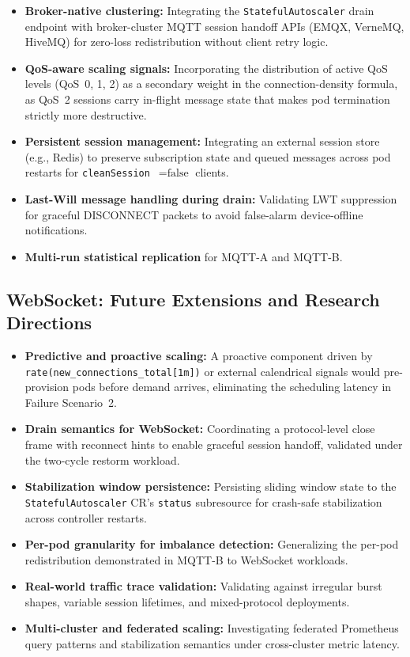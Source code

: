 \documentclass[twocolumn]{svjour3}
\begin{document}
\begin{itemize}[leftmargin=*]
  \item \textbf{Broker-native clustering:} Integrating the \texttt{StatefulAutoscaler} drain
    endpoint with broker-cluster MQTT session handoff APIs (EMQX, VerneMQ, HiveMQ) for
    zero-loss redistribution without client retry logic.
  \item \textbf{QoS-aware scaling signals:} Incorporating the distribution of active QoS levels
    (QoS~0, 1, 2) as a secondary weight in the connection-density formula, as QoS~2 sessions
    carry in-flight message state that makes pod termination strictly more destructive.
  \item \textbf{Persistent session management:} Integrating an external session store (e.g.,
    Redis) to preserve subscription state and queued messages across pod restarts for
    \texttt{cleanSession}~$= \text{false}$ clients.
  \item \textbf{Last-Will message handling during drain:} Validating LWT suppression for
    graceful DISCONNECT packets to avoid false-alarm device-offline notifications.
  \item \textbf{Multi-run statistical replication} for MQTT-A and MQTT-B.
\end{itemize}

\subsection{WebSocket: Future Extensions and Research Directions}

\begin{itemize}[leftmargin=*]
  \item \textbf{Predictive and proactive scaling:} A proactive component driven by
    \texttt{rate(new\_connections\_total[1m])} or external calendrical signals would
    pre-provision pods before demand arrives, eliminating the scheduling latency in
    Failure Scenario~2.
  \item \textbf{Drain semantics for WebSocket:} Coordinating a protocol-level close frame
    with reconnect hints to enable graceful session handoff, validated under the two-cycle
    restorm workload.
  \item \textbf{Stabilization window persistence:} Persisting sliding window state to the
    \texttt{StatefulAutoscaler} CR's \texttt{status} subresource for crash-safe stabilization
    across controller restarts.
  \item \textbf{Per-pod granularity for imbalance detection:} Generalizing the per-pod
    redistribution demonstrated in MQTT-B to WebSocket workloads.
  \item \textbf{Real-world traffic trace validation:} Validating against irregular burst shapes,
    variable session lifetimes, and mixed-protocol deployments.
  \item \textbf{Multi-cluster and federated scaling:} Investigating federated Prometheus query
    patterns and stabilization semantics under cross-cluster metric latency.
\end{itemize}
\end{document}
